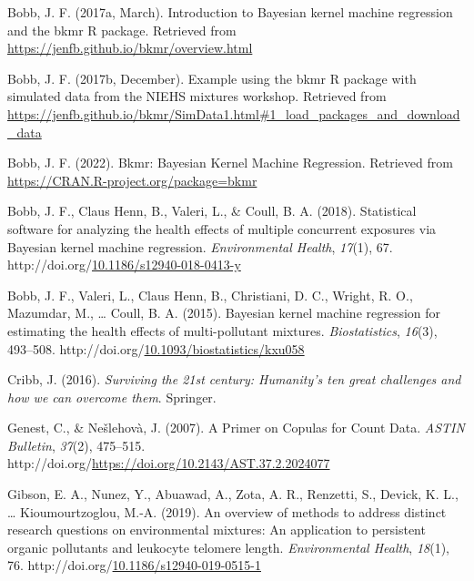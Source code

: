 \documentclass[12pt, twoside]{amherstthesis}
\newenvironment{CSLReferences}[2]%
  {}%
  {\par}
\begin{document}
\begin{CSLReferences}{1}{0}
\leavevmode{}%
Bobb, J. F. (2017a, March). Introduction to {Bayesian} kernel machine regression and the bkmr {R} package. Retrieved from \url{https://jenfb.github.io/bkmr/overview.html}

\leavevmode{}%
Bobb, J. F. (2017b, December). Example using the bkmr {R} package with simulated data from the {NIEHS} mixtures workshop. Retrieved from \url{https://jenfb.github.io/bkmr/SimData1.html\#1_load_packages_and_download_data}

\leavevmode{}%
Bobb, J. F. (2022). Bkmr: {Bayesian} {Kernel} {Machine} {Regression}. Retrieved from \url{https://CRAN.R-project.org/package=bkmr}

\leavevmode{}%
Bobb, J. F., Claus Henn, B., Valeri, L., \& Coull, B. A. (2018). Statistical software for analyzing the health effects of multiple concurrent exposures via {Bayesian} kernel machine regression. \emph{Environmental Health}, \emph{17}(1), 67. http://doi.org/\href{https://doi.org/10.1186/s12940-018-0413-y}{10.1186/s12940-018-0413-y}

\leavevmode{}%
Bobb, J. F., Valeri, L., Claus Henn, B., Christiani, D. C., Wright, R. O., Mazumdar, M., \ldots{} Coull, B. A. (2015). Bayesian kernel machine regression for estimating the health effects of multi-pollutant mixtures. \emph{Biostatistics}, \emph{16}(3), 493--508. http://doi.org/\href{https://doi.org/10.1093/biostatistics/kxu058}{10.1093/biostatistics/kxu058}

\leavevmode{}%
Cribb, J. (2016). \emph{Surviving the 21st century: {Humanity}'s ten great challenges and how we can overcome them}. Springer.

\leavevmode{}%
Genest, C., \& Nešlehovà, J. (2007). A {Primer} on {Copulas} for {Count} {Data}. \emph{ASTIN Bulletin}, \emph{37}(2), 475--515. http://doi.org/\url{https://doi.org/10.2143/AST.37.2.2024077}

\leavevmode{}%
Gibson, E. A., Nunez, Y., Abuawad, A., Zota, A. R., Renzetti, S., Devick, K. L., \ldots{} Kioumourtzoglou, M.-A. (2019). An overview of methods to address distinct research questions on environmental mixtures: An application to persistent organic pollutants and leukocyte telomere length. \emph{Environmental Health}, \emph{18}(1), 76. http://doi.org/\href{https://doi.org/10.1186/s12940-019-0515-1}{10.1186/s12940-019-0515-1}


\end{CSLReferences}
\end{document}
